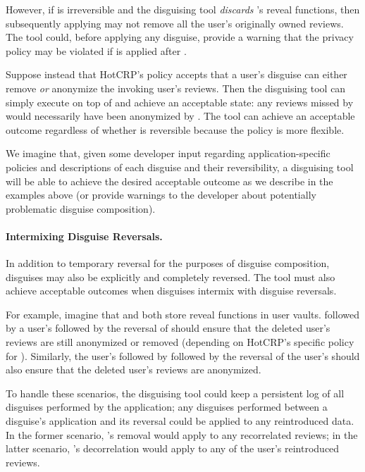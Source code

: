 However, if \ca is irreversible and the disguising tool \emph{discards} \ca's reveal functions, then
subsequently applying \gdpr may not remove all the user's originally owned reviews.  The tool could,
before applying any disguise, provide a warning that the privacy policy may be violated if \gdpr is
applied after \ca.

Suppose instead that HotCRP's policy accepts that a user's \gdpr disguise can either remove \emph{or}
anonymize the invoking user's reviews. Then the disguising tool can simply execute \gdpr on top of
\ca and achieve an acceptable state: any reviews missed by \gdpr would necessarily have been
anonymized by \ca.  The tool can achieve an acceptable outcome regardless of whether \ca is
reversible because the policy is more flexible.

We imagine that, given some developer input regarding application-specific policies and descriptions
of each disguise and their reversibility, a disguising tool will be able to achieve the desired acceptable
outcome as we describe in the examples above (or provide warnings to the developer about potentially
problematic disguise composition).

\paragraph{Intermixing Disguise Reversals.}
In addition to temporary reversal for the purposes of disguise composition, disguises may also be
explicitly and completely reversed. The tool must also achieve acceptable outcomes when disguises
intermix with disguise reversals.

For example, imagine that \ca and \gdpr both store reveal functions in user vaults. 
%
\ca followed by a user's \gdpr followed by the reversal of \ca should ensure that the deleted user's
reviews are still anonymized or removed (depending on HotCRP's specific policy for \gdpr).
Similarly, the user's \gdpr followed by \ca followed by the reversal of the user's \gdpr should also
ensure that the deleted user's reviews are anonymized.

To handle these scenarios, the disguising tool could keep a persistent log of all disguises
performed by the application; any disguises performed between a disguise's application and its
reversal could be applied to any reintroduced data. In the former scenario, \gdpr's removal would
apply to any recorrelated reviews; in the latter scenario, \ca's decorrelation would apply to any of
the user's reintroduced reviews.
